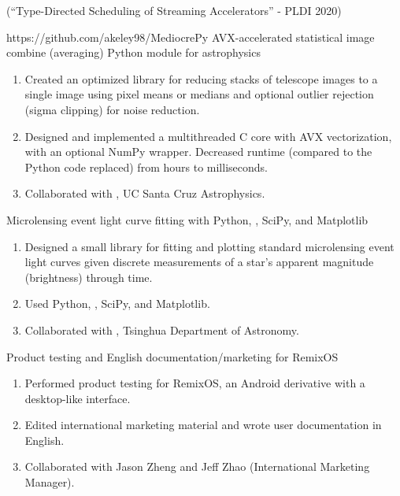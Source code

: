 \quad{} (``Type-Directed Scheduling of Streaming Accelerators'' - PLDI 2020)
\filbreak

\ifdefined\RESUME
{}
\fi

%
{https://github.com/akeley98/MediocrePy}%
{AVX-accelerated statistical image combine (averaging) Python module for astrophysics}
\ifdefined\CV
\begin{enumerate}
\item Created an optimized library for reducing stacks of
  telescope images to a single image using pixel means or medians and
  optional outlier rejection (sigma clipping) for noise reduction.
\item Designed and implemented a multithreaded C core with AVX
  vectorization, with an optional NumPy wrapper.  Decreased runtime
  (compared to the Python code replaced) from hours to milliseconds.
\item Collaborated with
  , UC Santa Cruz Astrophysics.
\end{enumerate}
\quad{}
\fi
\filbreak

%
{Microlensing event light curve fitting with Python, , SciPy, and Matplotlib}
\ifdefined\CV
\begin{enumerate}
\item Designed a small library for fitting and plotting standard
  microlensing event light curves given discrete measurements of a
  star's apparent magnitude (brightness) through time.
\item Used Python, , SciPy, and Matplotlib.
\item Collaborated with
  ,
  Tsinghua Department of Astronomy.
\end{enumerate}
\fi
\filbreak

%
{Product testing and English documentation/marketing for RemixOS}
\ifdefined\CV
\begin{enumerate}
\item Performed product testing for RemixOS, an Android derivative
  with a desktop-like interface.

\item Edited international marketing material and wrote user
  documentation in English.

\item Collaborated with Jason Zheng and Jeff Zhao (International
  Marketing Manager).
\end{enumerate}
\fi
\filbreak

